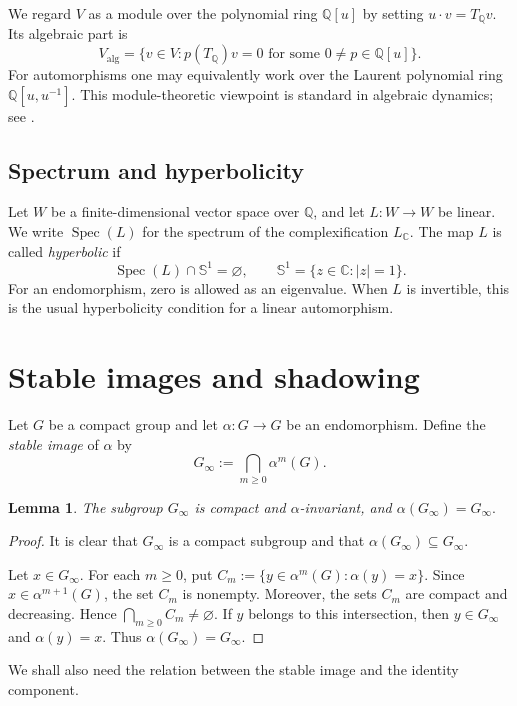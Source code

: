 \documentclass[12pt]{amsart}
\newtheorem{lemma}[theorem]{Lemma}
\theoremstyle{definition}
\numberwithin{equation}{section}
\theoremstyle{remark}
\begin{document}
We regard $V$ as a module over the polynomial ring $\mathbb Q[u]$ by setting
$u\cdot v=T_{\mathbb Q}v$. Its algebraic part is
\[
V_{\mathrm{alg}}
=
\{v\in V:p(T_{\mathbb Q})v=0
\text{ for some }0\neq p\in\mathbb Q[u]\}.
\]
For automorphisms one may equivalently work over the Laurent polynomial ring
$\mathbb Q[u,u^{-1}]$. This module-theoretic viewpoint is standard in
algebraic dynamics; see \cite{KitchensSchmidt,Schmidt}.

\subsection{Spectrum and hyperbolicity}

Let $W$ be a finite-dimensional vector space over $\mathbb Q$, and let
$L:W\to W$ be linear. We write $\operatorname{Spec}(L)$ for the spectrum of
the complexification $L_{\mathbb C}$. The map $L$ is called
\emph{hyperbolic} if
\[
\operatorname{Spec}(L)\cap\mathbb S^1=\varnothing,
\qquad
\mathbb S^1=\{z\in\mathbb C:|z|=1\}.
\]
For an endomorphism, zero is allowed as an eigenvalue. When $L$ is invertible,
this is the usual hyperbolicity condition for a linear automorphism.


\section{Stable images and shadowing}\label{sta}


Let $G$ be a compact group and let $\alpha:G\to G$ be an endomorphism.
Define the \emph{stable image} of $\alpha$ by
\[
G_\infty:=\bigcap_{m\geq 0}\alpha^m(G).
\]

\begin{lemma}\label{lem:stable-image-surjective}
The subgroup $G_\infty$ is compact and $\alpha$-invariant, and
$
\alpha(G_\infty)=G_\infty.
$
\end{lemma}

\begin{proof}
It is clear that $G_\infty$ is a compact subgroup and that
$
\alpha(G_\infty)\subseteq G_\infty.
$

Let $x\in G_\infty$. For each $m\geq 0$, put
$
C_m:=\{y\in\alpha^m(G):\alpha(y)=x\}.
$
Since $x\in\alpha^{m+1}(G)$, the set $C_m$ is nonempty. Moreover, the
sets $C_m$ are compact and decreasing. Hence
$
\bigcap_{m\geq 0}C_m\neq\varnothing.
$
If $y$ belongs to this intersection, then $y\in G_\infty$ and
$\alpha(y)=x$. Thus $\alpha(G_\infty)=G_\infty$.
\end{proof}

We shall also need the relation between the stable image and the
identity component.
\end{document}
